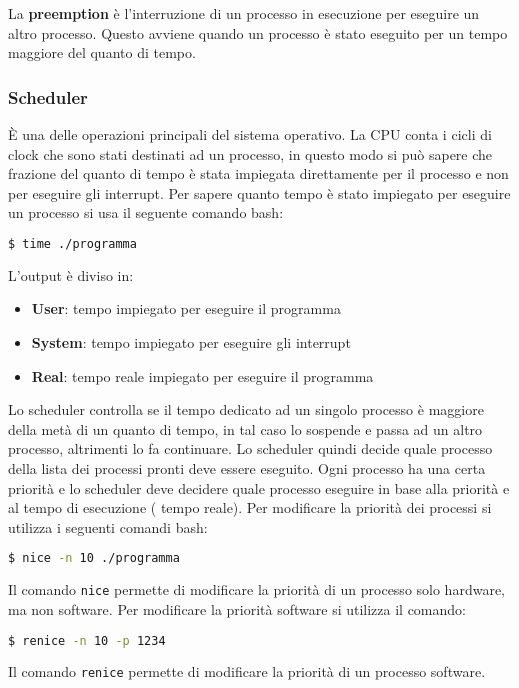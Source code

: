 \documentclass[a4paper]{article}
\theoremstyle{break}
\theoremstyle{break}
\theoremstyle{break}
\theoremstyle{break}
\begin{document}
\noindent La \textbf{preemption} è l'interruzione di un processo in esecuzione per
eseguire un altro processo. Questo avviene quando un processo è stato eseguito per
un tempo maggiore del quanto di tempo.

\subsubsection{Scheduler}
È una delle operazioni principali del sistema operativo. La CPU conta i cicli di clock
che sono stati destinati ad un processo, in questo modo si può sapere che frazione del
quanto di tempo è stata impiegata direttamente per il processo e non per eseguire gli
interrupt. Per sapere quanto tempo è stato impiegato per eseguire un processo si
usa il seguente comando bash:
\begin{lstlisting}[language=bash]
$ time ./programma
\end{lstlisting}
\noindent L'output è diviso in:
\begin{itemize}
  \item \textbf{User}: tempo impiegato per eseguire il programma
  \item \textbf{System}: tempo impiegato per eseguire gli interrupt
  \item \textbf{Real}: tempo reale impiegato per eseguire il programma
\end{itemize}

\vspace{1em}
\noindent Lo scheduler controlla se il tempo dedicato ad un singolo processo è maggiore
della metà di un quanto di tempo, in tal caso lo sospende e passa ad un altro processo,
altrimenti lo fa continuare. Lo scheduler quindi decide quale processo della lista dei
processi pronti deve essere eseguito. Ogni processo ha una certa priorità e lo scheduler
deve decidere quale processo eseguire in base alla priorità e al tempo di esecuzione (
tempo reale). Per modificare la priorità dei processi si utilizza i seguenti comandi bash:
\begin{lstlisting}[language=bash]
$ nice -n 10 ./programma
\end{lstlisting}
\noindent Il comando \texttt{nice} permette di modificare la priorità di un processo solo
hardware, ma non software. Per modificare la priorità software si utilizza il comando:
\begin{lstlisting}[language=bash]
$ renice -n 10 -p 1234
\end{lstlisting}
\noindent Il comando \texttt{renice} permette di modificare la priorità di un processo
software.
\end{document}
